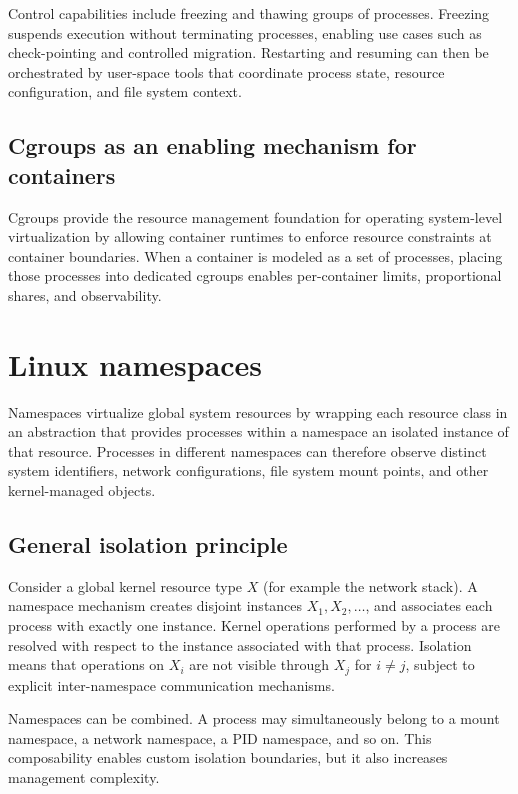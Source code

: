 \documentclass[11pt,a4paper,openany]{report}
\begin{document}
Control capabilities include freezing and thawing groups of processes. Freezing suspends execution without terminating processes, enabling use cases such as check-pointing and controlled migration. Restarting and resuming can then be orchestrated by user-space tools that coordinate process state, resource configuration, and file system context.

\subsection{Cgroups as an enabling mechanism for containers}

Cgroups provide the resource management foundation for operating system-level virtualization by allowing container runtimes to enforce resource constraints at container boundaries. When a container is modeled as a set of processes, placing those processes into dedicated cgroups enables per-container limits, proportional shares, and observability.

\section{Linux namespaces}

Namespaces virtualize global system resources by wrapping each resource class in an abstraction that provides processes within a namespace an isolated instance of that resource. Processes in different namespaces can therefore observe distinct system identifiers, network configurations, file system mount points, and other kernel-managed objects.

\subsection{General isolation principle}

Consider a global kernel resource type $X$ (for example the network stack). A namespace mechanism creates disjoint instances $X_1, X_2, \dots$, and associates each process with exactly one instance. Kernel operations performed by a process are resolved with respect to the instance associated with that process. Isolation means that operations on $X_i$ are not visible through $X_j$ for $i \neq j$, subject to explicit inter-namespace communication mechanisms.

Namespaces can be combined. A process may simultaneously belong to a mount namespace, a network namespace, a PID namespace, and so on. This composability enables custom isolation boundaries, but it also increases management complexity.
\end{document}
